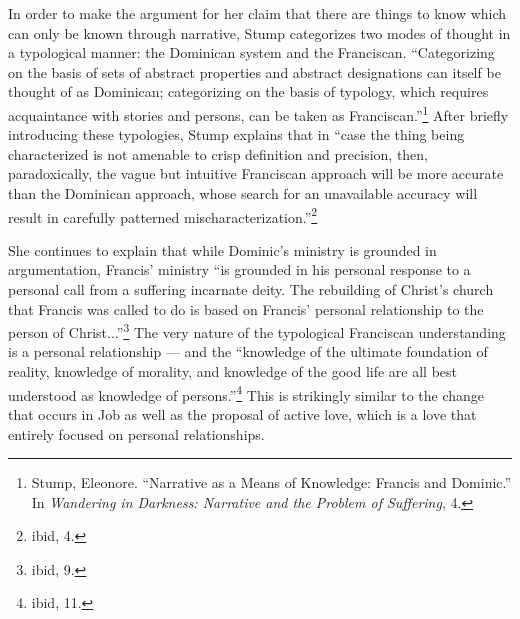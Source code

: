 In order to make the argument for her claim that there are things to know which can only be known through narrative, Stump categorizes two modes of thought in a typological manner: the Dominican system and the Franciscan. ``Categorizing on the basis of sets of abstract properties and abstract designations can itself be thought of as Dominican; categorizing on the basis of typology, which requires acquaintance with stories and persons, can be taken as Franciscan.''\footnote{Stump, Eleonore. ``Narrative as a Means of Knowledge: Francis and Dominic.'' In \emph{\emph{Wandering in Darkness: Narrative and the Problem of Suffering}}, 4.} After briefly introducing these typologies, Stump explains that in ``case the thing being characterized is not amenable to crisp definition and precision, then, paradoxically, the vague but intuitive Franciscan approach will be more accurate than the Dominican approach, whose search for an unavailable accuracy will result in carefully patterned mischaracterization.''\footnote{ibid, 4.}
 
She continues to explain that while Dominic's ministry is grounded in argumentation, Francis' ministry ``is grounded in his personal response to a personal call from a suffering incarnate deity. The rebuilding of Christ's church that Francis was called to do is based on Francis' personal relationship to the person of Christ...''\footnote{ibid, 9.} The very nature of the typological Franciscan understanding is a personal relationship --- and the ``knowledge of the ultimate foundation of reality, knowledge of morality, and knowledge of the good life are all best understood as knowledge of persons.''\footnote{ibid, 11.} This is strikingly similar to the change that occurs in Job as well as the proposal of active love, which is a love that entirely focused on personal relationships.

